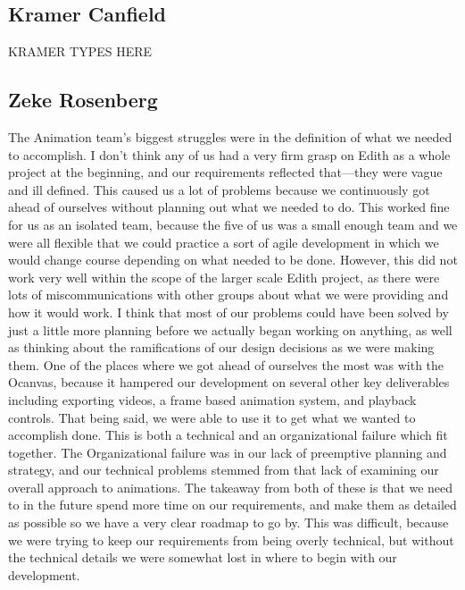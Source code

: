 \documentclass[12pt]{article}
\begin{document}
\subsection{Kramer Canfield}
\begin{changemargin}{1cm}{0cm} 
KRAMER TYPES HERE
\end{changemargin} 
\subsection{Zeke Rosenberg}
\begin{changemargin}{1cm}{0cm} 
The Animation team’s biggest struggles were in the definition of what we needed to accomplish. I don’t think any of us had a very firm grasp on Edith as a whole project at the beginning, and our requirements reflected that—they were vague and ill defined. This caused us a lot of problems because we continuously got ahead of ourselves without planning out what we needed to do. This worked fine for us as an isolated team, because the five of us was a small enough team and we were all flexible that we could practice a sort of agile development in which we would change course depending on what needed to be done. However, this did not work very well within the scope of the larger scale Edith project, as there were lots of miscommunications with other groups about what we were providing and how it would work. 
	I think that most of our problems could have been solved by just a little more planning before we actually began working on anything, as well as thinking about the ramifications of our design decisions as we were making them. One of the places where we got ahead of ourselves the most was with the Ocanvas, because it hampered our development on several other key deliverables including exporting videos, a frame based animation system, and playback controls. That being said, we were able to use it to get what we wanted to accomplish done. This is both a technical and an organizational failure which fit together. The Organizational failure was in our lack of preemptive planning and strategy, and our technical problems stemmed from that lack of examining our overall approach to animations. The takeaway from both of these is that we need to in the future spend more time on our requirements, and make them as detailed as possible so we have a very clear roadmap to go by. This was difficult, because we were trying to keep our requirements from being overly technical, but without the technical details we were somewhat lost in where to begin with our development. 

\end{changemargin}
\end{document}
